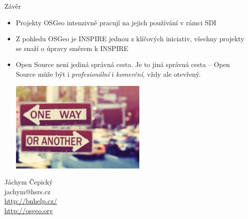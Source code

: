 \documentclass{beamer}
\begin{document}
\begin{frame}{Závěr}

  \begin{itemize}
  \item
    Projekty OSGeo intenzivně pracují na jejich používání v rámci SDI
  \item
    Z pohledu OSGeo je INSPIRE jednou z klíčových iniciativ, všechny projekty se
    snaží o úpravy směrem k INSPIRE
  \item Open Source není jediná správná cesta. Je to jiná správná cesta --
      Open Source může být i {\em profesionální} i {\em komerční}, vždy ale
      \alert{otevřený}.

\begin{center} 
    \includegraphics[height=4.5cm]{imgs/ils/oneway.png}
\end{center}
  
\end{itemize}
  
\end{frame}


\begin{frame}
    \begin{center}
        Jáchym Čepický \\
        jachym@hsrs.cz \\
        \url{http://bnhelp.cz/} \\
        \url{http://osgeo.org}
    \end{center}
\end{frame}
\end{document}
